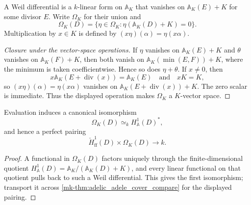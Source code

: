 \begin{definition}
  \label{mk-def:adelic_weil_differentials}
  A Weil differential is a \(k\)-linear form on \(\mathbb A_K\) that
  vanishes on \(\mathbb A_K(E)+K\) for some divisor \(E\).  Write
  \(\Omega_K\) for their union and
  \[
    \Omega_K(D)=
      \{\eta\in\Omega_K:\eta(\mathbb A_K(D)+K)=0\}.
  \]
  Multiplication by \(x\in K\) is defined by
  \((x\eta)(\alpha)=\eta(x\alpha)\).
\end{definition}
\begin{proof}[Closure under the vector-space operations]
  If \(\eta\) vanishes on \(\mathbb A_K(E)+K\) and \(\theta\) vanishes
  on \(\mathbb A_K(F)+K\), then both vanish on
  \(\mathbb A_K(\min(E,F))+K\), where the minimum is taken
  coefficientwise.  Hence so does \(\eta+\theta\).  If \(x\ne0\), then
  \[
    x\mathbb A_K(E+\operatorname{div}(x))=\mathbb A_K(E)
    \quad\text{and}\quad xK=K,
  \]
  so \((x\eta)(\alpha)=\eta(x\alpha)\) vanishes on
  \(\mathbb A_K(E+\operatorname{div}(x))+K\).  The zero scalar is
  immediate.
  Thus the displayed operation makes \(\Omega_K\) a \(K\)-vector
  space.
\end{proof}

\begin{proposition}
  \label{mk-thm:adelic_residuePairing}
  \notready
  Evaluation induces a canonical isomorphism
  \[
    \Omega_K(D)\simeq_k H^1_{\mathbb A}(D)^*,
  \]
  and hence a perfect pairing
  \[
    \check H^1_{\mathrm{ff}}(D)\times\Omega_K(D)\longrightarrow k.
  \]
\end{proposition}
\begin{proof}
  A functional in \(\Omega_K(D)\) factors uniquely through the
  finite-dimensional quotient
  \(H^1_{\mathbb A}(D)=\mathbb A_K/(\mathbb A_K(D)+K)\), and every linear
  functional on that quotient pulls back to such a Weil differential.
  This gives the first isomorphism; transport it across
  \ref{mk-thm:adelic_adele_cover_compare} for the displayed pairing.
\end{proof}

